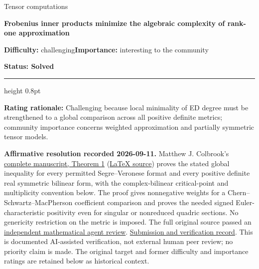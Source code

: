 \documentclass[11pt,a4paper]{article}
\begin{document}
{\sffamily\small\color{muted}Tensor computations\par}
\vspace{3pt}
{\raggedright{}\sffamily\bfseries\fontsize{21}{24}\selectfont\color{ink}Frobenius
inner products minimize the algebraic complexity of rank-one
approximation\par}
\vspace{7pt}
{\sffamily\small\textbf{Difficulty:} challenging\quad\textbf{Importance:} interesting
to the community\par}
{\sffamily\small\bfseries\color{accent}Status: Solved\par}
\vspace{4pt}
{\color{accent}\hrule height 0.8pt}
\vspace{6pt}
\textbf{Rating rationale:} Challenging because local minimality of ED
degree must be strengthened to a global comparison across all positive
definite metrics; community importance concerns weighted approximation
and partially symmetric tensor models.

\textbf{Affirmative resolution recorded 2026-09-11.} Matthew J.
Colbrook's
\href{https://github.com/ajt60gaibb/OpenProblemsInNLA/blob/main/references/colbrook-tensor-metrics-rank-2026-09-11/manuscripts/tr17_solution.pdf}{complete
manuscript, Theorem 1}
(\href{https://github.com/ajt60gaibb/OpenProblemsInNLA/blob/main/references/colbrook-tensor-metrics-rank-2026-09-11/manuscripts/tr17_solution.tex}{LaTeX
source}) proves the stated global inequality for every permitted
Segre--Veronese format and every positive definite real symmetric
bilinear form, with the complex-bilinear critical-point and multiplicity
convention below. The proof gives nonnegative weights for a
Chern--Schwartz--MacPherson coefficient comparison and proves the needed
signed Euler-characteristic positivity even for singular or nonreduced
quadric sections. No genericity restriction on the metric is imposed.
The full original source passed an
\href{https://github.com/ajt60gaibb/OpenProblemsInNLA/blob/main/references/colbrook-tensor-metrics-rank-2026-09-11/verification/reviews/TR-17-review.md}{independent
mathematical agent review}.
\href{https://github.com/ajt60gaibb/OpenProblemsInNLA/blob/main/references/colbrook-tensor-metrics-rank-2026-09-11/README.md}{Submission
and verification record}. This is documented AI-assisted verification,
not external human peer review; no priority claim is made. The original
target and former difficulty and importance ratings are retained below
as historical context.
\end{document}
